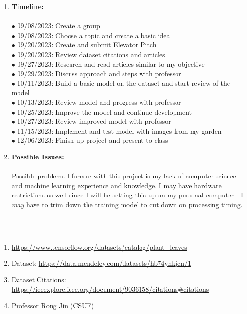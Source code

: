 \documentclass{article}
\begin{document}
\begin{enumerate}
	\item \textbf{Timeline:}\\~\\
	
	$\bullet$ 09/08/2023: Create a group\\
	$\bullet$ 09/08/2023: Choose a topic and create a basic idea\\
	$\bullet$ 09/20/2023: Create and submit Elevator Pitch\\
	$\bullet$ 09/20/2023: Review dataset citations and articles\\
	$\bullet$ 09/27/2023: Research and read articles similar to my objective\\
	$\bullet$ 09/29/2023: Discuss approach and steps with professor\\
	$\bullet$ 10/11/2023: Build a basic model on the dataset and start review of the model\\
	$\bullet$ 10/13/2023: Review model and progress with professor\\
	$\bullet$ 10/25/2023: Improve the model and continue development\\
	$\bullet$ 10/27/2023: Review improved model with professor\\
	$\bullet$ 11/15/2023: Implement and test model with images from my garden\\
	$\bullet$ 12/06/2023: Finish up project and present to class\\
	
	\item \textbf{Possible Issues:}\\~\\
	
	Possible problems I foresee with this project is my lack of computer science and machine learning experience and knowledge. I may have hardware restrictions as well since I will be setting this up on my personal computer - I \textit{may} have to trim down the training model to cut down on processing timing.\\	
		
\end{enumerate}	
	\newpage
	
\\~\\
\begin{flushleft}
\begin{enumerate}
	\item \url{https://www.tensorflow.org/datasets/catalog/plant_leaves}
	\item Dataset: \url{https://data.mendeley.com/datasets/hb74ynkjcn/1}
	\item Dataset Citations: \url{https://ieeexplore.ieee.org/document/9036158/citations#citations}
	\item Professor Rong Jin (CSUF)
\end{enumerate}
\end{flushleft}
\end{document}
